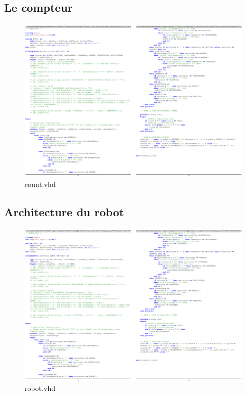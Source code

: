 \documentclass{article}
\begin{document}
\begin{landscape}


\subsection{Le compteur}
\begin{figure}[!h]
\centering
\includegraphics[scale=0.60]{robot.PNG}
\caption{count.vhd}
\end{figure} 

\newpage

\subsection{Architecture du robot}
\begin{figure}[!h]
\centering

\includegraphics[scale=0.60]{robot.PNG}
\caption{robot.vhd}
\end{figure} 


\end{landscape}
\end{document}
